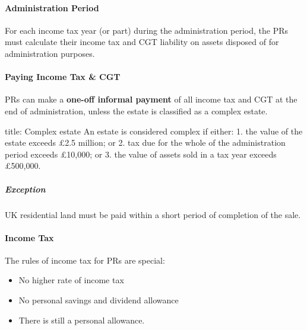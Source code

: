 \documentclass[
]{article}
\newenvironment{Shaded}{}{}
\newcommand{\NormalTok}[1]{#1}
\providecommand{\tightlist}{%
  \setlength{\itemsep}{0pt}\setlength{\parskip}{0pt}}
\begin{document}
\hypertarget{administration-period-1}{%
\paragraph{Administration Period}\label{administration-period-1}}

For each income tax year (or part) during the administration period, the
PRs must calculate their income tax and CGT liability on assets disposed
of for administration purposes.

\hypertarget{paying-income-tax-cgt}{%
\paragraph{Paying Income Tax \& CGT}\label{paying-income-tax-cgt}}

PRs can make a \textbf{one-off informal payment} of all income tax and
CGT at the end of administration, unless the estate is classified as a
complex estate.

\begin{Shaded}
\begin{Highlighting}[]
\NormalTok{title: Complex estate}
\NormalTok{An estate is considered complex if either: }
\NormalTok{1. the value of the estate exceeds £2.5 million; or }
\NormalTok{2. tax due for the whole of the administration period exceeds £10,000; or }
\NormalTok{3. the value of assets sold in a tax year exceeds £500,000.}
\end{Highlighting}
\end{Shaded}

\hypertarget{exception}{%
\subparagraph{Exception}\label{exception}}

UK residential land must be paid within a short period of completion of
the sale.

\hypertarget{income-tax}{%
\paragraph{Income Tax}\label{income-tax}}

The rules of income tax for PRs are special:

\begin{itemize}
\tightlist
\item
  No higher rate of income tax
\item
  No personal savings and dividend allowance
\item
  There is still a personal allowance.
\end{itemize}
\end{document}
